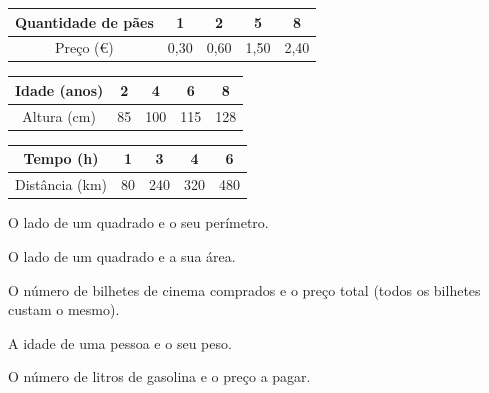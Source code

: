 \documentclass[12pt]{article}
\begin{document}


\begin{exercicios}
  \item \begin{tabular}[c]{|c|c|c|c|c|}\hline
    Quantidade de pães & 1 & 2 & 5 & 8 \\\hline
    Preço (€) & 0,30 & 0,60 & 1,50 & 2,40 \\\hline
  \end{tabular}
  \item \begin{tabular}[c]{|c|c|c|c|c|}\hline
    Idade (anos) & 2 & 4 & 6 & 8 \\\hline
    Altura (cm) & 85 & 100 & 115 & 128 \\\hline
  \end{tabular}
  \item \begin{tabular}[c]{|c|c|c|c|c|}\hline
    Tempo (h) & 1 & 3 & 4 & 6 \\\hline
    Distância (km) & 80 & 240 & 320 & 480 \\\hline
  \end{tabular}
  \item O lado de um quadrado e o seu perímetro.
  \item O lado de um quadrado e a sua área.
  \item O número de bilhetes de cinema comprados e o preço total (todos os bilhetes custam o mesmo).
  \item A idade de uma pessoa e o seu peso.
  \item O número de litros de gasolina e o preço a pagar.
\end{exercicios}
\end{document}
